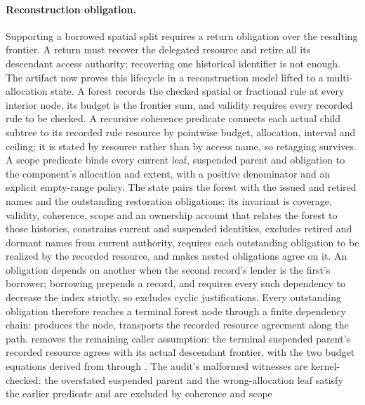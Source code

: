 \documentclass[a4paper,UKenglish,cleveref]{lipics-v2021}
\begin{document}
\paragraph*{Reconstruction obligation.}
Supporting a borrowed spatial split requires a return obligation over the
resulting frontier. A return must recover the delegated resource and retire all
its descendant access authority; recovering one historical identifier is not
enough. The artifact now proves this lifecycle in a reconstruction model lifted
to a multi-allocation state. A forest records the checked spatial or fractional
rule at every interior node, its budget is the frontier sum, and validity
requires every recorded rule to be checked. A recursive coherence predicate
connects each actual child subtree to its recorded rule resource by pointwise
budget, allocation, interval and ceiling; it is stated by resource rather than by
access name, so retagging survives. A scope predicate binds every current leaf,
suspended parent and obligation to the component's allocation and extent, with a
positive denominator and an explicit empty-range policy. The state pairs the
forest with the issued and retired names and the outstanding restoration
obligations; its invariant is coverage, validity, coherence, scope and an
ownership account that relates the forest to those histories, constrains current
and suspended identities, excludes retired and dormant names from current
authority, requires each outstanding obligation to be realized by the recorded
resource, and makes nested obligations agree on it. An obligation depends on another when the second
record's lender is the first's borrower; borrowing prepends a record, and
 requires every such dependency to decrease the
 index strictly, so  excludes cyclic
justifications. Every outstanding obligation therefore reaches a terminal forest
node through a finite dependency chain:  produces
the node,  transports the recorded resource
agreement along the path.  removes
the remaining caller assumption: the terminal suspended parent's recorded
resource agrees with its actual descendant frontier, with the two budget
equations derived from  through
. The audit's malformed witnesses are
kernel-checked: the overstated suspended parent and the wrong-allocation leaf
satisfy the earlier predicate and are excluded by coherence and scope
\end{document}
